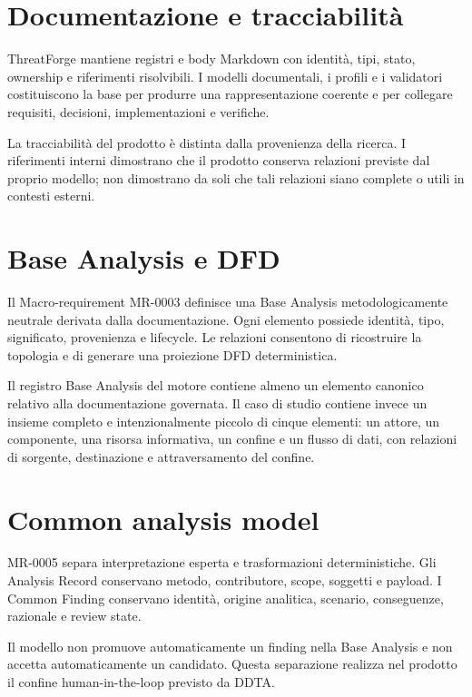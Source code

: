 \documentclass[12pt,a4paper,oneside]{report}
\begin{document}
\section{Documentazione e tracciabilità}

ThreatForge mantiene registri e body Markdown con identità, tipi, stato, ownership e riferimenti risolvibili. I modelli documentali, i profili e i validatori costituiscono la base per produrre una rappresentazione coerente e per collegare requisiti, decisioni, implementazioni e verifiche.

La tracciabilità del prodotto è distinta dalla provenienza della ricerca. I riferimenti interni dimostrano che il prodotto conserva relazioni previste dal proprio modello; non dimostrano da soli che tali relazioni siano complete o utili in contesti esterni.

\section{Base Analysis e DFD}

Il Macro-requirement MR-0003 definisce una Base Analysis metodologicamente neutrale derivata dalla documentazione. Ogni elemento possiede identità, tipo, significato, provenienza e lifecycle. Le relazioni consentono di ricostruire la topologia e di generare una proiezione DFD deterministica.

Il registro Base Analysis del motore contiene almeno un elemento canonico relativo alla documentazione governata. Il caso di studio contiene invece un insieme completo e intenzionalmente piccolo di cinque elementi: un attore, un componente, una risorsa informativa, un confine e un flusso di dati, con relazioni di sorgente, destinazione e attraversamento del confine.

\section{Common analysis model}

MR-0005 separa interpretazione esperta e trasformazioni deterministiche. Gli Analysis Record conservano metodo, contributore, scope, soggetti e payload. I Common Finding conservano identità, origine analitica, scenario, conseguenze, razionale e review state.

Il modello non promuove automaticamente un finding nella Base Analysis e non accetta automaticamente un candidato. Questa separazione realizza nel prodotto il confine human-in-the-loop previsto da DDTA.
\end{document}
